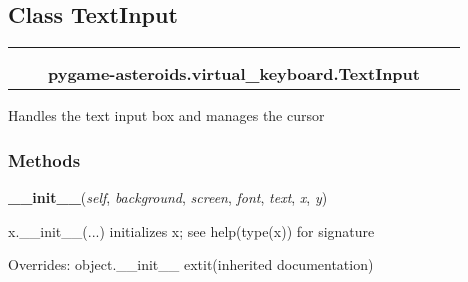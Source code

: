 \subsection{Class TextInput}

    \label{pygame-asteroids:virtual_keyboard:TextInput}
\begin{tabular}{cccccc}
\multicolumn{2}{r}{\settowidth{\BCL}{object}\multirow{2}{\BCL}{object}}
&&
  \\\cline{3-3}
  &&\multicolumn{1}{c|}{}
&&
  \\
&&\multicolumn{2}{l}{\textbf{pygame-asteroids.virtual\_keyboard.TextInput}}
\end{tabular}

Handles the text input box and manages the cursor



  \subsubsection{Methods}

    \vspace{0.5ex}

\hspace{.8\funcindent}\begin{boxedminipage}{\funcwidth}

    \raggedright \textbf{\_\_init\_\_}(\textit{self}, \textit{background}, \textit{screen}, \textit{font}, \textit{text}, \textit{x}, \textit{y})

\setlength{\parskip}{2ex}
    x.\_\_init\_\_(...) initializes x; see help(type(x)) for signature

\setlength{\parskip}{1ex}
      Overrides: object.\_\_init\_\_ 	extit{(inherited documentation)}

    \end{boxedminipage}

    \label{pygame-asteroids:virtual_keyboard:TextInput:draw}

    \vspace{0.5ex}

